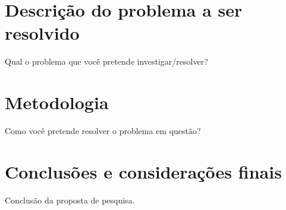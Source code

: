 \documentclass[10pt,a4paper]{article}
\begin{document}
\section{Descrição do problema a ser resolvido}
Qual o problema que você pretende investigar/resolver?

\section{Metodologia}
Como você pretende resolver o problema em questão?

\section{Conclusões e considerações finais}
Conclusão da proposta de pesquisa.




\end{document}
